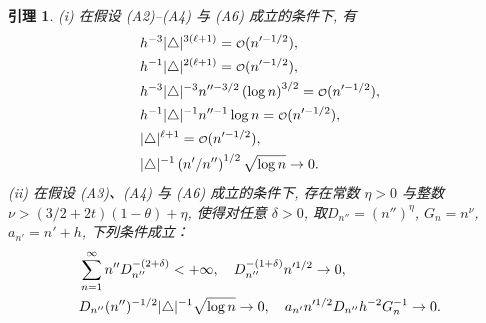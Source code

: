 \documentclass[a4paper,openay,14pt]{ctexbook}
\newtheorem{lem}{引理}
\numberwithin{equation}{section}
\numberwithin{lem}{section}
\begin{document}
\begin{lem} \label{Lemma:order}
    (i) 在假设 (A2)--(A4) 与 (A6) 成立的条件下, 有
    \begin{align}
        & h^{-3}\vert \triangle \vert ^{3(\ell+1)} = {\scriptstyle{\mathcal{O}}}(n'^{-1/2}),\label{EQ:h^-3delta^3d+3}\\
        & h^{-1} \vert \triangle \vert ^{2(\ell+1)} = {\scriptstyle{\mathcal{O}}}(n'^{-1/2}), \notag\\ 
        & h^{-3}\vert \triangle \vert ^{-3} n''^{-3/2} \left(\log n \right)^{3/2} = {\scriptstyle{\mathcal{O}}}(n'^{-1/2}),\label{EQ:h^-3delta^-3} \\ 
        & h^{-1}\vert \triangle \vert^{-1}n''^{-1}
        \log n = {\scriptstyle{\mathcal{O}}}(n'^{-1/2}),\notag\\
        & \vert\triangle \vert^{\ell+1}= {\scriptstyle{\mathcal{O}}}(n'^{-1/2}), \label{EQ:delta^d+1}\\
        & \vert\triangle\vert^{-1} \left(n'/n''\right)^{1/2}\sqrt{\log n}\to 0.\label{EQ:delta^-1n'/n''}
    \end{align}
    (ii) 在假设 (A3)、(A4) 与 (A6) 成立的条件下, 存在常数 $\eta>0$ 与整数$\nu>(3/2+2t)(1-\theta)+\eta$, 使得对任意 $\delta>0$, 取$D_{n''}=(n'')^{\eta}$, $G_n=n^{\nu}$, $a_{n'}=n'+h$, 下列条件成立：
    \begin{align}
        & \sum_{n=1}^{\infty} n''D_{n''}^{-(2+\delta)} < +\infty, \quad D_{n''}^{-(1+\delta)} n'^{1/2} \to 0,\label{EQ:Dn''order}\\
        & D_{n''}(n'')^{-1/2}\vert\triangle\vert^{-1}\sqrt{\log n} \to 0, \quad a_{n'}n'^{1/2}D_{n''}h^{-2}G_n^{-1}\to 0.\notag
    \end{align}
\end{lem}
\end{document}
